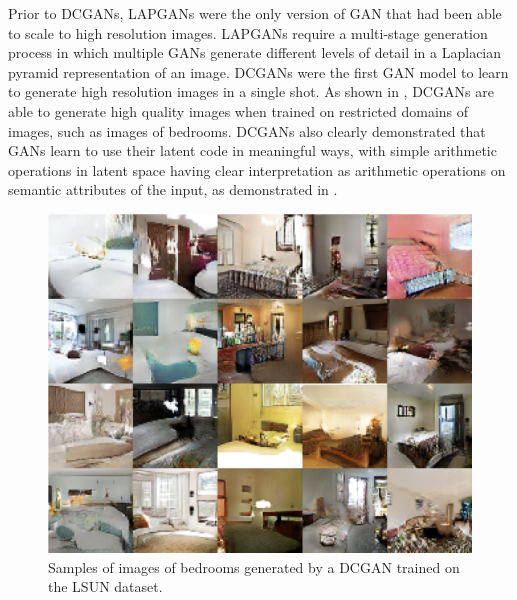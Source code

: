 Prior to DCGANs, LAPGANs \citep{denton2015deep} were the only version of GAN
that had been able to scale to high resolution images.
LAPGANs require a multi-stage generation process in which multiple GANs
generate different levels of detail in a Laplacian pyramid representation
of an image.
DCGANs were the first GAN model to learn to generate high resolution images
in a single shot.
As shown in , DCGANs are able to generate high quality
images when trained on restricted domains of images, such as images of bedrooms.
DCGANs also clearly demonstrated that GANs learn to use their latent code
in meaningful ways, with simple arithmetic operations in latent space
having clear interpretation as arithmetic operations on semantic attributes
of the input, as demonstrated in .


\begin{figure}
  \centering
  \includegraphics[width=\figwidth]{dcgan_lsun}
  \caption{Samples of images of bedrooms generated by a DCGAN trained on the LSUN dataset.}
  \label{fig:dcgan_lsun}
\end{figure}

